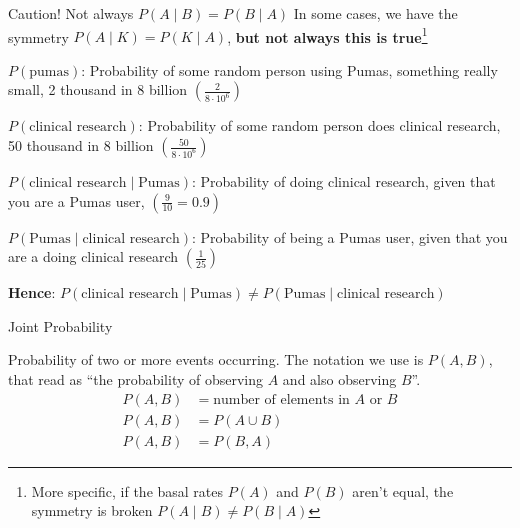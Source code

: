 \begin{frame}{Caution!
		Not always $P(A \mid B) = P(B \mid A)$} In some cases, we have the symmetry $P(A \mid K) = P(K \mid A)$, \textbf{but not always this is true}\footnote{ More specific, if the basal rates $P(A)$ and $P(B)$ aren't equal, the symmetry is broken $P(A \mid B) \neq P(B \mid A)$}
	\begin{example}
		\begin{vfilleditems}
			\small{ \item $P(\text{pumas})$: Probability of some random person using Pumas, something really small, 2 thousand in 8 billion $\left( \frac{2}{8 \cdot 10^6} \right)$ \item $P(\text{clinical research})$: Probability of some random person does clinical research, 50 thousand in 8 billion $\left( \frac{50}{8 \cdot 10^6} \right)$ \item $P(\text{clinical research} \mid \text{Pumas})$: Probability of doing clinical research, given that you are a Pumas user, $\left( \frac{9}{10} = 0.9 \right)$ \item $P(\text{Pumas} \mid \text{clinical research})$: Probability of being a Pumas user, given that you are a doing clinical research $\left( \frac{1}{25} \right)$ } \item \large{\textbf{Hence}: $P(\text{clinical research} \mid \text{Pumas}) \neq P(\text{Pumas} \mid \text{clinical research})$}
		\end{vfilleditems}
	\end{example}
\end{frame}

\begin{frame}{Joint Probability}
	\begin{defn} Probability of two or more events occurring.
		\newline \newline
		The notation we use is $P(A, B)$, that read as
		``the probability of observing $A$ and also observing $B$''. \newline \newline
		$$
			\begin{aligned}
				P(A,B) & = \text{number of elements in $A$ or $B$} \\ P(A,B) & = P(A \cup B) \\ P(A,B) & = P(B,A)
			\end{aligned}
		$$
	\end{defn}
\end{frame}

